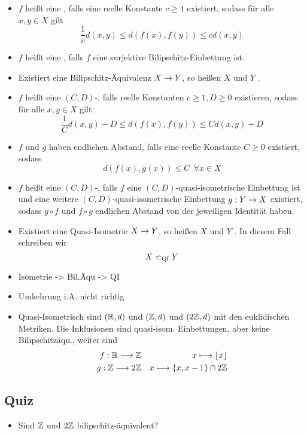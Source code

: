 \documentclass{article}
\newcommand{\qi}{\backsimeq_{\textsc{QI}}}
\begin{document}
\Def{}
\begin{itemize}
	\item $f$ heißt eine , falls eine reelle Konstante $c \geq 1$ existiert, sodass für alle $x,y \in X$ gilt
	\[ \frac{1}{c} d(x,y) \leq  d(f(x),f(y)) \leq c d(x,y) \]
	\item $f$ heißt eine , falls $f$ eine surjektive Bilipschitz-Einbettung ist.
	\item Existiert eine Bilipschitz-Äquivalenz $X\overset{}{\rightarrow} Y$, so heißen $X$ und $Y$ .
\end{itemize}

\Def{}
\begin{itemize}
	\item $f$ heißt eine $(C,D)$-, falls reelle Konstanten $c \geq 1, D\geq 0$ existieren, sodass für alle $x,y \in X$ gilt
	\[ \frac{1}{C} d(x,y) - D \leq  d(f(x),f(y)) \leq C d(x,y) + D \]
	\item $f$ und $g$ haben endlichen Abstand, falls eine reelle Konstante $C \geq 0$ existiert, sodass
	\[d(f(x), g(x)) \leq C ~~ \forall x \in X \]
	\item $f$ heißt eine $(C,D)$-, falls $f$ eine $(C,D)$-{quasi-isometrische Einbettung} ist und eine weitere $(C,D)$-{quasi-isometrische Einbettung} $g : Y \overset{}{\rightarrow} X$ existiert, sodass $g \circ f$ und $f \circ g$ endlichen Abstand von der jeweiligen Identität haben.
	\item Existiert eine Quasi-Isometrie $X\overset{}{\rightarrow} Y$, so heißen $X$ und $Y$ . In diesem Fall schreiben wir
	\[ X \qi Y \]
\end{itemize}

\Bem{}
\begin{itemize}
	\item Isometrie -> Bil.Äqu -> QI
	\item Umkehrung i.A. nicht richtig
	\item Quasi-Isometrisch sind $(\mathbb{R},d)$ und $(\mathbb{Z}, d)$ und $(2\mathbb{Z}, d)$ mit den euklidischen Metriken.
	Die Inklusionen sind quasi-isom. Einbettungen, aber keine Bilipschitzäqu., weiter sind
	\begin{align*}
	f:\mathbb{R} \longrightarrow \mathbb{Z} && x \longmapsto \lfloor x\rfloor\\
	g: \mathbb{Z} \longrightarrow 2\mathbb{Z} && x \longmapsto \{x, x -1\}\cap 2\mathbb{Z}
	\end{align*}
\end{itemize}
\subsection{Quiz}
\begin{itemize}
	\item Sind $\mathbb{Z}$ und $2\mathbb{Z}$ bilipschitz-äquivalent?
\end{itemize}
\end{document}
